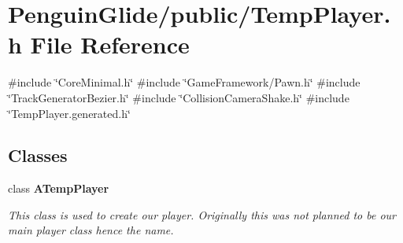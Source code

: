 \section{Penguin\+Glide/public/\+Temp\+Player.h File Reference}
\label{_temp_player_8h}
{\ttfamily \#include \char`\"{}Core\+Minimal.\+h\char`\"{}}\newline
{\ttfamily \#include \char`\"{}Game\+Framework/\+Pawn.\+h\char`\"{}}\newline
{\ttfamily \#include \char`\"{}Track\+Generator\+Bezier.\+h\char`\"{}}\newline
{\ttfamily \#include \char`\"{}Collision\+Camera\+Shake.\+h\char`\"{}}\newline
{\ttfamily \#include \char`\"{}Temp\+Player.\+generated.\+h\char`\"{}}\newline
\subsection*{Classes}
\begin{DoxyCompactItemize}
\item 
class \textbf{ A\+Temp\+Player}
\begin{DoxyCompactList}\small\item\em This class is used to create our player. Originally this was not planned to be our main player class hence the name. \end{DoxyCompactList}\end{DoxyCompactItemize}
